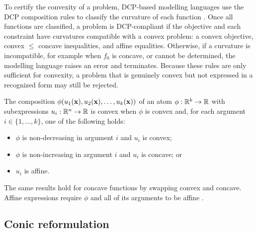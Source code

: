 To certify the convexity of a problem, DCP-based modelling languages use the DCP composition
rules to classify
the curvature of each function \cite{grant2004disciplined}.
Once all functions are classified, a problem is DCP-compliant if the objective and
each constraint have curvatures compatible with a convex problem: a convex objective,
convex $\leq$ concave inequalities, and affine equalities.
Otherwise, if a curvature is incompatible, for example when $f_0$ is concave, or cannot be
determined, the modelling language raises an error and terminates.
Because these rules are only sufficient for convexity, a problem that is genuinely convex
but not expressed in a recognized form may still be rejected.

The composition $\phi(u_1(\mathbf{x}), u_2(\mathbf{x}), \dots, u_k(\mathbf{x}))$ of an atom
$\phi : \mathbb{R}^k \to \mathbb{R}$ with subexpressions $u_i : \mathbb{R}^n \to \mathbb{R}$
is convex when $\phi$ is convex and, for each argument $i \in \{1, \dots, k\}$, one of the
following holds:
\begin{itemize}
    \item $\phi$ is non-decreasing in argument $i$ and $u_i$ is convex;
    \item $\phi$ is non-increasing in argument $i$ and $u_i$ is concave; or
    \item $u_i$ is affine.
\end{itemize}
The same results hold for concave functions by swapping convex and concave.
Affine expressions require $\phi$ and all of its arguments to be affine \cite{grant2004disciplined}.

\subsection{Conic reformulation}\label{sec:bg-canonicalization}

